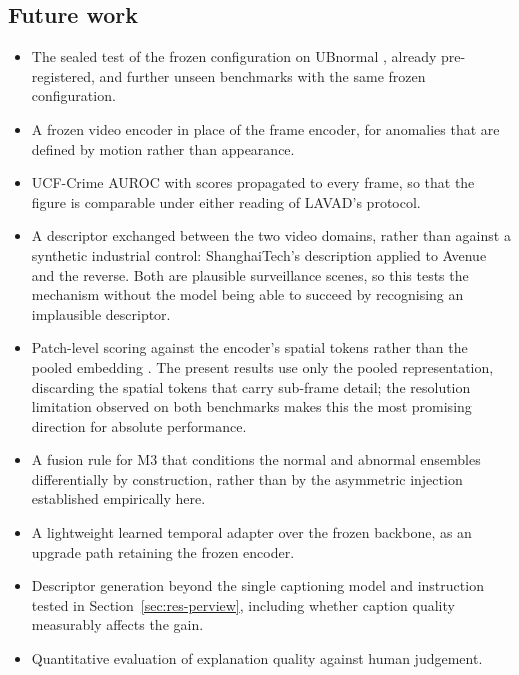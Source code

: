 \documentclass[a4paper,fleqn]{cas-sc}
\begin{document}
\subsection{Future work}
\begin{itemize}
  \item The sealed test of the frozen configuration on UBnormal
        \citep{acsintoae2022ubnormal}, already pre-registered, and further
        unseen benchmarks with the same frozen configuration.
  \item A frozen video encoder in place of the frame encoder, for anomalies that
        are defined by motion rather than appearance.
  \item UCF-Crime AUROC with scores propagated to every frame, so that the
        figure is comparable under either reading of LAVAD's protocol.
  \item A descriptor exchanged between the two video domains, rather than
        against a synthetic industrial control: ShanghaiTech's description
        applied to Avenue and the reverse. Both are plausible surveillance
        scenes, so this tests the mechanism without the model being able to
        succeed by recognising an implausible descriptor.
  \item Patch-level scoring against the encoder's spatial tokens rather than the
        pooled embedding \citep{jeong2023winclip, zhou2024anomalyclip}. The
        present results use only the pooled representation, discarding the
        spatial tokens that carry sub-frame detail; the resolution limitation
        observed on both benchmarks makes this the most promising direction for
        absolute performance.
  \item A fusion rule for M3 that conditions the normal and abnormal ensembles
        differentially by construction, rather than by the asymmetric injection
        established empirically here.
  \item A lightweight learned temporal adapter over the frozen backbone, as an
        upgrade path retaining the frozen encoder.
  \item Descriptor generation beyond the single captioning model and
        instruction tested in Section~\ref{sec:res-perview}, including whether
        caption quality measurably affects the gain.
  \item Quantitative evaluation of explanation quality against human judgement.
\end{itemize}

\printcredits



\end{document}
